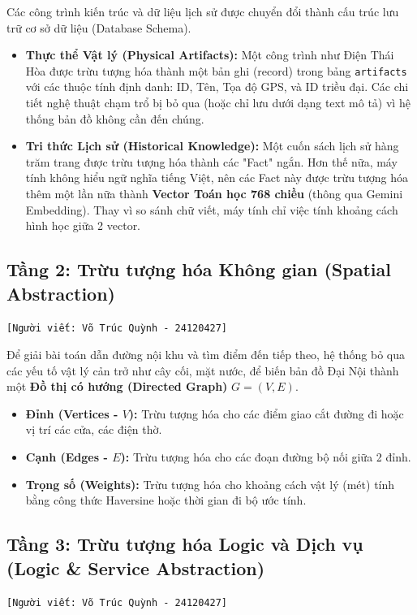 Các công trình kiến trúc và dữ liệu lịch sử được chuyển đổi thành cấu trúc lưu trữ cơ sở dữ liệu (Database Schema).
\begin{itemize}
    \item \textbf{Thực thể Vật lý (Physical Artifacts):} Một công trình như Điện Thái Hòa được trừu tượng hóa thành một bản ghi (record) trong bảng \texttt{artifacts} với các thuộc tính định danh: ID, Tên, Tọa độ GPS, và ID triều đại. Các chi tiết nghệ thuật chạm trổ bị bỏ qua (hoặc chỉ lưu dưới dạng text mô tả) vì hệ thống bản đồ không cần đến chúng.
    \item \textbf{Tri thức Lịch sử (Historical Knowledge):} Một cuốn sách lịch sử hàng trăm trang được trừu tượng hóa thành các "Fact" ngắn. Hơn thế nữa, máy tính không hiểu ngữ nghĩa tiếng Việt, nên các Fact này được trừu tượng hóa thêm một lần nữa thành \textbf{Vector Toán học 768 chiều} (thông qua Gemini Embedding). Thay vì so sánh chữ viết, máy tính chỉ việc tính khoảng cách hình học giữa 2 vector.
\end{itemize}

\subsection{Tầng 2: Trừu tượng hóa Không gian (Spatial Abstraction)}
\texttt{[Người viết: Võ Trúc Quỳnh - 24120427]}

Để giải bài toán dẫn đường nội khu và tìm điểm đến tiếp theo, hệ thống bỏ qua các yếu tố vật lý cản trở như cây cối, mặt nước, để biến bản đồ Đại Nội thành một \textbf{Đồ thị có hướng (Directed Graph)} $G = (V, E)$.
\begin{itemize}
    \item \textbf{Đỉnh (Vertices - $V$):} Trừu tượng hóa cho các điểm giao cắt đường đi hoặc vị trí các cửa, các điện thờ.
    \item \textbf{Cạnh (Edges - $E$):} Trừu tượng hóa cho các đoạn đường bộ nối giữa 2 đỉnh.
    \item \textbf{Trọng số (Weights):} Trừu tượng hóa cho khoảng cách vật lý (mét) tính bằng công thức Haversine hoặc thời gian đi bộ ước tính.
\end{itemize}

\subsection{Tầng 3: Trừu tượng hóa Logic và Dịch vụ (Logic \& Service Abstraction)}
\texttt{[Người viết: Võ Trúc Quỳnh - 24120427]}

